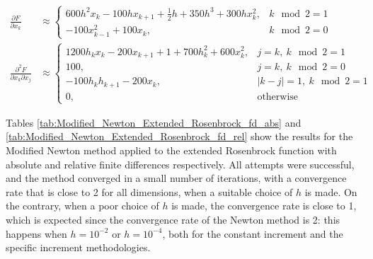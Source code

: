 \begin{align*}
    \frac{\partial F}{\partial x_k} &\approx \left \{ \begin{array}{ll}
        600h^2 x_k - 100hx_{k+1} + \frac12h + 350h^3 + 300hx_k^2, & k\mod 2 = 1\\
        -100x_{k-1}^2 + 100x_k, & k\mod 2 = 0
    \end{array} \right .\\
    \frac{\partial^2 F}{\partial x_k \partial x_j} &\approx \left \{ \begin{array}{ll}
        1200h_k x_k - 200x_{k+1} + 1 + 700h_k^2 + 600x_k^2, & j = k,\ k\mod 2 = 1\\
        100, & j = k,\ k\mod 2 = 0\\
        -100 h_k h_{k+1} - 200 x_k, & \lvert k-j \rvert = 1,\ k\mod 2 = 1\\
        0, & \text{otherwise}
    \end{array} \right .
\end{align*}

Tables \ref{tab:Modified_Newton_Extended_Rosenbrock_fd_abs} and \ref{tab:Modified_Newton_Extended_Rosenbrock_fd_rel} show the results for the Modified Newton method applied to the extended Rosenbrock function with absolute and relative finite differences respectively.
All attempts were successful, and the method converged in a small number of iterations, with a convergence rate that is close to 2 for all dimensions, when a suitable choice of $h$ is made.
On the contrary, when a poor choice of $h$ is made, the convergence rate is close to 1, which is expected since the convergence rate of the Newton method is 2: this happens when $h=10^{-2}$ or $h=10^{-4}$, both for the constant increment and the specific increment methodologies.

